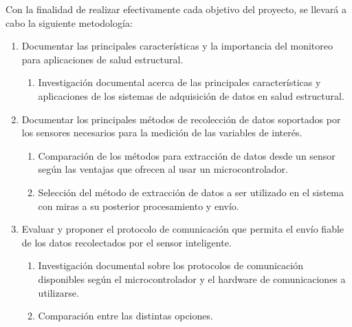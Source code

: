 \documentclass[12pt,letterpaper]{article}
\begin{document}
\vspace{1cm}

Con la finalidad de realizar efectivamente cada objetivo del proyecto, se llevará a cabo la siguiente metodología:
\bigskip

\begin{enumerate}[1.]



	\item Documentar las principales características y la importancia del monitoreo para aplicaciones de salud estructural.

	      \begin{enumerate}

		      \item Investigación documental acerca de las principales características y aplicaciones de los sistemas de adquisición de datos en salud estructural.


	      \end{enumerate}

	\item  Documentar los principales métodos de recolección de datos soportados por los sensores necesarios para la medición de las variables de interés.


	      \begin{enumerate}

			  \item Comparación de los métodos para extracción de datos desde un sensor según las ventajas que ofrecen al usar un microcontrolador.

		      \item Selección del método de extracción de datos a ser utilizado en el sistema con miras a su posterior procesamiento y envío.

	      \end{enumerate}


	\item Evaluar y proponer el protocolo de comunicación que permita el envío fiable de los datos recolectados por el sensor inteligente.

	      \begin{enumerate}

		      \item Investigación documental sobre los protocolos de comunicación disponibles según el microcontrolador y el hardware de comunicaciones a utilizarse.

		      \item Comparación entre las distintas opciones.


\end{enumerate}
\end{enumerate}
\end{document}
